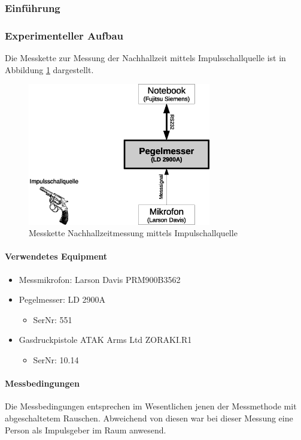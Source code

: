 \documentclass[11pt]{report}
\begin{document}
\subsubsection{Einf\"uhrung}
\label{Impulseinfuehrung}
\subsubsection{Experimenteller Aufbau}
Die Messkette zur Messung der Nachhallzeit mittels Impulsschallquelle ist in Abbildung \ref{fig:impulsaufbau} dargestellt.
\begin{figure}[htbp]
\begin{center}
\includegraphics[width=8cm,keepaspectratio=true]{impulsaufbau}
\caption{Messkette Nachhallzeitmessung mittels Impulschallquelle}
\label{fig:impulsaufbau}
\end{center}
\end{figure}
\paragraph{Verwendetes Equipment}
\begin{itemize}
\item Messmikrofon: Larson Davis PRM900B3562
\item Pegelmesser: LD 2900A
\begin{itemize}
\item SerNr: 551
\end{itemize}
\item Gasdruckpistole ATAK Arms Ltd ZORAKI.R1
\begin{itemize}
\item SerNr: 10.14
\end{itemize}
\end{itemize}
\paragraph{Messbedingungen}
Die Messbedingungen entsprechen im Wesentlichen jenen der Messmethode mit abgeschaltetem Rauschen. Abweichend von diesen war bei dieser Messung eine Person als Impulsgeber im Raum anwesend.
\end{document}
